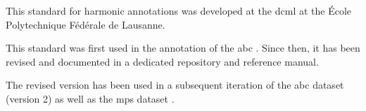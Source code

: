 

This standard for harmonic annotations was developed at the
\gls{dcml} at the \'Ecole Polytechnique F\'ed\'erale de
Lausanne.

This standard was first used in the annotation of the
\gls{abc}
\parencite{neuwirth2018annotated}. Since then, it has been
revised and documented in a dedicated
repository
and reference
manual.

The revised version has been used in a subsequent iteration
of the \gls{abc} dataset (version 2) as well as the
\gls{mps} dataset \parencite{hentschel2021annotated}.
